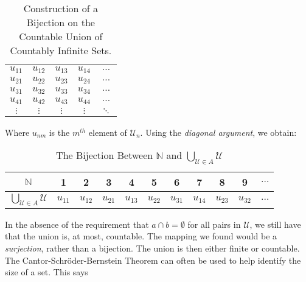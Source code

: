        \begin{table}[H]
            \captionsetup{type=table}
            \centering
            \begin{tabular}{ccccc}
                $u_{11}$&$u_{12}$&$u_{13}$
                &$u_{14}$&$\hdots$\\
                $u_{21}$&$u_{22}$&$u_{23}$
                &$u_{24}$&$\hdots$\\
                $u_{31}$&$u_{32}$&$u_{33}$
                &$u_{34}$&$\hdots$\\
                $u_{41}$&$u_{42}$&$u_{43}$
                &$u_{44}$&$\hdots$\\
                $\vdots$&$\vdots$&$\vdots$
                &$\vdots$&$\ddots$
            \end{tabular}
            \caption{Construction of a Bijection on the
                     Countable Union of Countably Infinite
                     Sets.}
            \label{table:Func_Countable_Union_of_Countable}
        \end{table}
        Where $u_{nm}$ is the $m^{th}$ element of
        $\mathcal{U}_{n}$.
        Using the \textit{diagonal argument},
        we obtain:
        \begin{table}[H]
            \captionsetup{type=table}
            \centering
            \begin{tabular}{|c|c|c|c|c|c|c|c|c|c|c|}
                \hline
                $\mathbb{N}$&1&2&3&4&5&6&7&8&9&$\hdots$\\
                \hline
                $\bigcup_{\mathcal{U}\in{A}}\mathcal{U}$&
                $u_{11}$&$u_{12}$&$u_{21}$&$u_{13}$&
                $u_{22}$&$u_{31}$&$u_{14}$&$u_{23}$&
                $u_{32}$&$\hdots$\\
                \hline
            \end{tabular}
            \caption{The Bijection Between $\mathbb{N}$ and
                     $\bigcup_{\mathcal{U}\in{A}}\mathcal{U}$}
            \label{table:Func_Bijection_on_Countable_Union}
        \end{table}
        In the absence of the requirement that
        $a\cap{b}=\emptyset$ for all pairs in $\mathcal{U}$,
        we still have that the union is, at most, countable.
        The mapping we found would be a
        \textit{surjection}, rather than a bijection.
        The union is then either finite or countable. The
        Cantor-Schr\"{o}der-Bernstein Theorem can often be
        used to help identify the size of a set. This says
